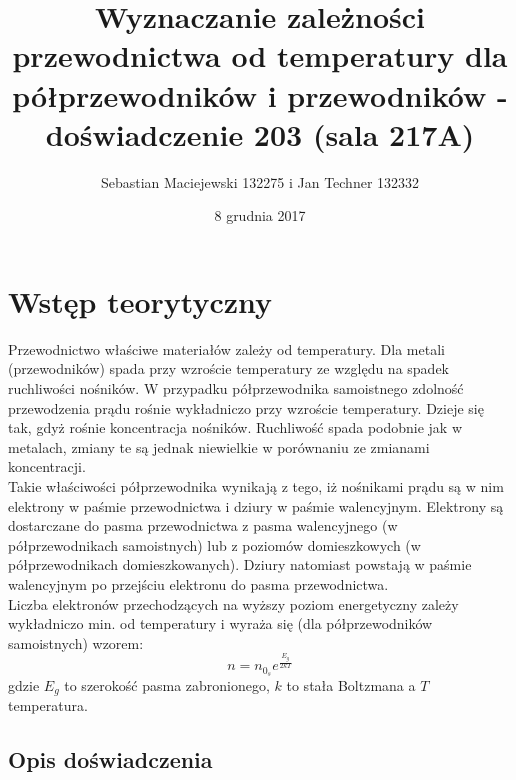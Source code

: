 \documentclass[10pt,a4paper]{article}
\author{Sebastian Maciejewski 132275 i Jan Techner 132332}
\title{Wyznaczanie zależności przewodnictwa od temperatury 
dla półprzewodników i przewodników - \\ doświadczenie 203 (sala 217A)}
\date{8 grudnia 2017}
\newcommand{\forceindent}{\leavevmode{\parindent=3em\indent}}
\begin{document}
\maketitle
\section{Wstęp teorytyczny}
\forceindent Przewodnictwo właściwe materiałów zależy od temperatury. Dla metali (przewodników) spada przy wzroście temperatury ze względu na spadek ruchliwości nośników. W przypadku półprzewodnika samoistnego zdolność przewodzenia prądu rośnie wykładniczo przy wzroście temperatury. Dzieje się tak, gdyż rośnie koncentracja nośników. Ruchliwość spada podobnie jak w metalach, zmiany te są jednak niewielkie w porównaniu ze zmianami koncentracji.\\
Takie właściwości półprzewodnika wynikają z tego, iż nośnikami prądu są w nim elektrony w paśmie przewodnictwa i dziury w paśmie walencyjnym. Elektrony są dostarczane do pasma przewodnictwa z pasma walencyjnego (w półprzewodnikach samoistnych) lub z poziomów domieszkowych (w półprzewodnikach domieszkowanych). Dziury natomiast powstają w paśmie walencyjnym po przejściu elektronu do pasma przewodnictwa.\\
Liczba elektronów przechodzących na wyższy poziom energetyczny zależy wykładniczo min. od temperatury i wyraża się (dla półprzewodników samoistnych) wzorem:
\begin{equation}
n = n_{0_s} e^{\frac{E_g}{2kT}}
\end{equation}
gdzie $E_g$ to szerokość pasma zabronionego, $k$ to stała Boltzmana a $T$ temperatura.

\subsection*{Opis doświadczenia}
\end{document}
